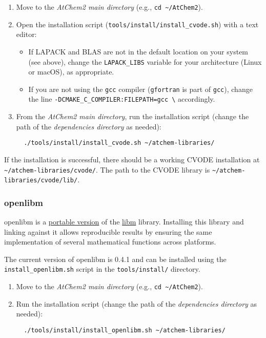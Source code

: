 \begin{enumerate}
\item Move to the \emph{AtChem2 main directory} (e.g., \texttt{cd\
    \textasciitilde{}/AtChem2}).
\item Open the installation script
  (\texttt{tools/install/install\_cvode.sh}) with a text editor:
  \begin{itemize}
  \item If LAPACK and BLAS are not in the default location on your
    system (see above), change the \texttt{LAPACK\_LIBS} variable for
    your architecture (Linux or macOS), as appropriate.
  \item If you are not using the \texttt{gcc} compiler
    (\texttt{gfortran} is part of \texttt{gcc}), change the line
    \texttt{-DCMAKE\_C\_COMPILER:FILEPATH=gcc\ \textbackslash{}}
    accordingly.
  \end{itemize}
\item From the \emph{AtChem2 main directory}, run the installation
  script (change the path of the \emph{dependencies directory} as
  needed):
  \begin{verbatim}
  ./tools/install/install_cvode.sh ~/atchem-libraries/
  \end{verbatim}
\end{enumerate}

If the installation is successful, there should be a working CVODE
installation at
\texttt{\textasciitilde{}/atchem-libraries/cvode/}. The path to the
CVODE library is
\texttt{\textasciitilde{}/atchem-libraries/cvode/lib/}.

\subsubsection{openlibm} \label{openlibm}

openlibm is a \href{http://openlibm.org/}{portable version} of the
\href{https://en.wikipedia.org/wiki/C_mathematical_functions}{libm}
library. Installing this library and linking against it allows
reproducible results by ensuring the same implementation of several
mathematical functions across platforms.

The current version of openlibm is 0.4.1 and can be installed using
the \texttt{install\_openlibm.sh} script in the
\texttt{tools/install/} directory.

\begin{enumerate}
\item Move to the \emph{AtChem2 main directory} (e.g., \texttt{cd\
    \textasciitilde{}/AtChem2}).
\item Run the installation script (change the path of the
  \emph{dependencies directory} as needed):
  \begin{verbatim}
  ./tools/install/install_openlibm.sh ~/atchem-libraries/
  \end{verbatim}
\end{enumerate}

